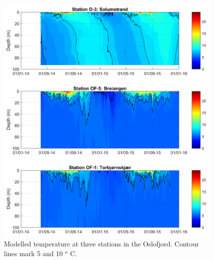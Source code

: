\begin{figure}[htb]
	\centerline{
		\includegraphics*[trim=0cm 0cm 0cm 0cm,clip=true,width=\textwidth]{Figurer/Temp_Mod_2014_2015}}
	\caption{\small Modelled temperature at three stations in the Oslofjord. Contour lines mark 5 and 10 $^{\textrm{o}}$ C.}
	\label{fig:Temp_Mod_2014_2015}
\end{figure}

